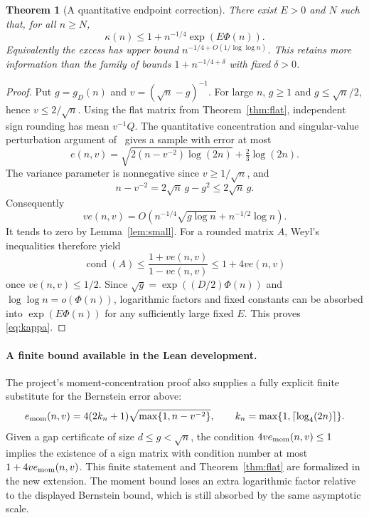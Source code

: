 \documentclass[11pt]{article}
\newtheorem{theorem}{Theorem}[section]
\newcommand{\ph}{\Phi}
\begin{document}
\begin{theorem}[A quantitative endpoint correction]\label{thm:kappa}
There exist $E>0$ and $N$ such that, for all $n\ge N$,
\begin{equation}\label{eq:kappa}
\kappa(n)\le1+n^{-1/4}\exp(E\ph(n)).
\end{equation}
Equivalently the excess has upper bound
$n^{-1/4+O(1/\log\log n)}$. This retains more information than the
family of bounds $1+n^{-1/4+\delta}$ with fixed $\delta>0$.
\end{theorem}
\begin{proof}
Put $g=g_D(n)$ and $v=(\sqrt n-g)^{-1}$. For large $n$, $g\ge1$ and
$g\le\sqrt n/2$, hence $v\le2/\sqrt n$.
Using the flat matrix from Theorem~\ref{thm:flat}, independent sign
rounding has mean $v^{-1}Q$. The quantitative concentration and
singular-value perturbation argument of~\cite[proof of Theorem 1]{AJM}
gives a sample with error at most
\[
e(n,v)=\sqrt{2(n-v^{-2})\log(2n)}+\tfrac23\log(2n).
\]
The variance parameter is nonnegative since $v\ge1/\sqrt n$, and
\[
n-v^{-2}=2\sqrt n\,g-g^2\le2\sqrt n\,g.
\]
Consequently
\[
v e(n,v)=O\!\left(n^{-1/4}\sqrt{g\log n}
                 +n^{-1/2}\log n\right).
\]
It tends to zero by Lemma~\ref{lem:small}. For a rounded matrix $A$,
Weyl's inequalities therefore yield
\[
\operatorname{cond}(A)\le\frac{1+v e(n,v)}{1-v e(n,v)}
\le1+4v e(n,v)
\]
once $v e(n,v)\le1/2$. Since
$\sqrt g=\exp((D/2)\ph(n))$ and
$\log\log n=o(\ph(n))$, logarithmic factors and fixed constants can be
absorbed into $\exp(E\ph(n))$ for any sufficiently large fixed $E$.
This proves \eqref{eq:kappa}.
\end{proof}

\paragraph{A finite bound available in the Lean development.}
The project's moment-concentration proof also supplies a fully explicit
finite substitute for the Bernstein error above:
\[
e_{\rm mom}(n,v)=4(2k_n+1)\sqrt{\max\{1,n-v^{-2}\}},\qquad
k_n=\max\{1,\lceil\log_4(2n)\rceil\}.
\]
Given a gap certificate of size $d\le g<\sqrt n$, the condition
$4v e_{\rm mom}(n,v)\le1$ implies the existence of a sign matrix with
condition number at most $1+4v e_{\rm mom}(n,v)$. This finite statement
and Theorem~\ref{thm:flat} are formalized in the new extension. The
moment bound loses an extra logarithmic factor relative to the displayed
Bernstein bound, which is still absorbed by the same asymptotic scale.
\end{document}
